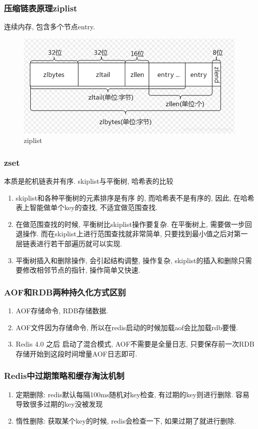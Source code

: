 \documentclass[UTF8]{ctexart}
\begin{document}
\subsubsection{压缩链表原理ziplist}
连续内存, 包含多个节点entry.
\begin{figure}
	\centering
	\includegraphics[width=0.7\linewidth]{figures/ziplist.png}
	\caption{ziplist}
	\label{fig:ziplist}
\end{figure}
\subsubsection{zset}
本质是舵机链表并有序.
skiplist与平衡树, 哈希表的比较
\begin{enumerate}
	\item skiplist和各种平衡树的元素排序是有序 的, 而哈希表不是有序的, 因此, 在哈希表上智能做单个key的查找, 不适宜做范围查找.
	\item 在做范围查找的时候, 平衡树比skiplist操作要复杂. 在平衡树上, 需要做一步回退操作. 而在skiplist上进行范围查找就非常简单, 只要找到最小值之后对第一层链表进行若干部遍历就可以实现.
	\item 平衡树插入和删除操作, 会引起结构调整, 操作复杂, skiplist的插入和删除只需要修改相邻节点的指针, 操作简单又快速.
\end{enumerate}

\subsubsection{AOF和RDB两种持久化方式区别}
\begin{enumerate}
	\item AOF存储命令, RDB存储数据.
	\item AOF文件因为存储命令, 所以在redis启动的时候加载aof会比加载rdb要慢. 
	\item Redis 4.0 之后 启动了混合模式, AOF不需要是全量日志, 只要保存前一次RDB存储开始到这段时间增量AOF日志即可.
\end{enumerate}
\subsubsection{Redis中过期策略和缓存淘汰机制}
\begin{enumerate}
	\item 定期删除: redis默认每隔100ms随机对key检查, 有过期的key则进行删除. 容易导致很多过期的key没被发现
	\item 惰性删除: 获取某个key的时候, redis会检查一下, 如果过期了就进行删除.
\end{enumerate}
\end{document}
